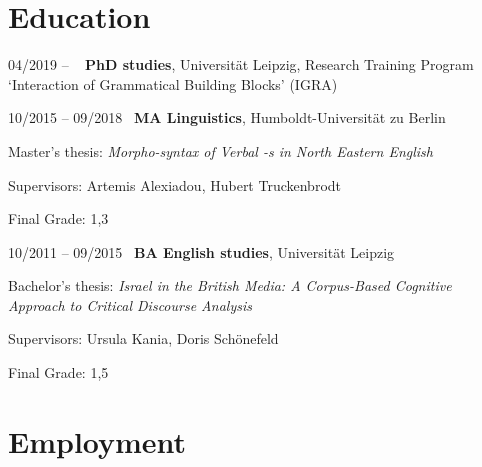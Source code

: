 \documentclass[11pt]{article}
\begin{document}


\section*{Education}


\begin{list}{}{
			\setlength{\leftmargin}{3.5cm}
			\setlength{\itemindent}{-2.5cm}
		}
	\item[04/2019 -- \phantom{09/2018}~] \textbf{PhD studies}, Universität Leipzig, Research Training Program `Interaction of Grammatical Building Blocks' (IGRA)
 
	\item[10/2015 -- 09/2018~] \textbf{MA Linguistics}, Humboldt-Universität zu Berlin
	\vspace{-.5em}
	\begin{list}{}{
			\setlength{\leftmargin}{1cm}
			\setlength{\itemindent}{-1cm}
		}
	\item Master's thesis: \textit{Morpho-syntax of Verbal \textit{-s} in North Eastern English}
	\item Supervisors: Artemis Alexiadou, Hubert Truckenbrodt
	\item Final Grade: 1,3
	\end{list}

	\item[10/2011 -- 09/2015~] \textbf{BA English studies}, Universität Leipzig
	\vspace{-.5em}
	\begin{list}{}{
			\setlength{\leftmargin}{1cm}
			\setlength{\itemindent}{-1cm}
		}
	\item Bachelor's thesis: \textit{Israel in the British Media: A Corpus-Based Cognitive Approach to Critical Discourse Analysis}
	\item Supervisors: Ursula Kania, Doris Schönefeld
	\item Final Grade: 1,5
	\end{list}
\end{list}

\section*{Employment}
\end{document}
